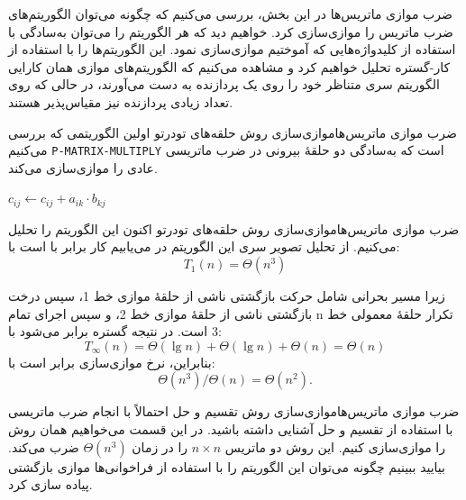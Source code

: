 \begin{itemframe}{ضرب موازی ماتریس‌ها}
\itm
در این بخش، بررسی می‌کنیم که چگونه می‌توان الگوریتم‌های ضرب ماتریس را موازی‌سازی کرد.
خواهیم دید که هر الگوریتم را می‌توان به‌سادگی با استفاده از کلید‌واژه‌هایی که آموختیم موازی‌سازی نمود.
\itm
این الگوریتم‌ها را با استفاده از کار-گستره تحلیل خواهیم کرد و مشاهده می‌کنیم که الگوریتم‌های موازی همان کارایی الگوریتم سری متناظر خود را روی یک پردازنده به دست می‌آورند، در حالی که روی تعداد زیادی پردازنده نیز مقیاس‌پذیر هستند.
\end{itemframe}


\begin{itemframe-s}{ضرب موازی ماتریس‌ها}{موازی‌سازی روش حلقه‌های تودرتو}
\itm
اولین الگوریتمی که بررسی می‌کنیم
\texttt{P-MATRIX-MULTIPLY}
است که به‌سادگی دو حلقهٔ بیرونی در ضرب ماتریسی عادی را موازی‌سازی می‌کند.
\begin{algorithm}[H]\alglr
\caption{P-MATRIX-MULTIPLY}
\begin{algorithmic}[1]
 
     
            \State $c_{ij} \gets c_{ij} + a_{ik} \cdot b_{kj}$
        \EndFor
    \EndpFor
\EndpFor
\end{algorithmic}
\end{algorithm}

\end{itemframe-s}


\begin{itemframe-s}{ضرب موازی ماتریس‌ها}{موازی‌سازی روش حلقه‌های تودرتو}
\itm
اکنون این الگوریتم را تحلیل می‌کنیم. از تحلیل تصویر سری این الگوریتم در می‌یابیم کار برابر با است با:
$$
T_1(n) = \Theta(n^3)
$$

\itm
زیرا مسیر بحرانی شامل حرکت بازگشتی ناشی از حلقهٔ موازی خط 1، سپس درخت بازگشتی ناشی از حلقهٔ موازی خط 2، و سپس اجرای تمام n تکرار حلقهٔ معمولی خط 3 است. در نتیجه گستره برابر می‌شود با:
$$
T_\infty(n) = \Theta(\lg n) + \Theta(\lg n) + \Theta(n) = \Theta(n)
$$
بنابراین، نرخ موازی‌سازی برابر است با:
$$
\Theta(n^3) / \Theta(n) = \Theta(n^2).
$$
\end{itemframe-s}


\begin{itemframe-s}{ضرب موازی ماتریس‌ها}{موازی‌سازی روش تقسیم و حل}
\itm
احتمالاً با انجام ضرب ماتریسی با استفاده از تقسیم و حل آشنایی داشته باشید. در این قسمت می‌خواهیم همان روش را موازی‌سازی کنیم.
\itm
این روش دو ماتریس
$n \times n$
را در زمان
$\Theta(n^3)$
ضرب می‌کند.
\itm
بیایید ببینیم چگونه می‌توان این الگوریتم را با استفاده از فراخوانی‌ها موازی بازگشتی پیاده سازی کرد.
\end{itemframe-s}


